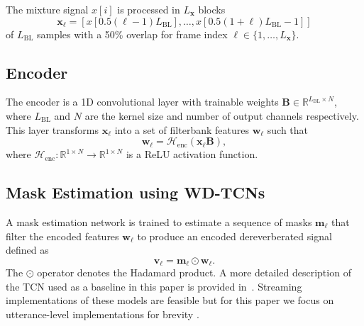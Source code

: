 \documentclass{article}
\newcommand{\mat}[1]{\mathbf{#1}}
\newcommand{\vek}[1]{\ensuremath{\mathbf{#1}}}    \newcommand{\vekc}[1]{\ensuremath{\boldsymbol{\mathcal{#1}}}}
\newcommand{\Real}{\mathbb{R}}
\begin{document}
The mixture signal $x[i]$ is processed in $L_\vek{x}$ blocks 
\begin{equation}\label{eq:InputSignalBlock}
    \vek{x}_\ell = 
\left[x[0.5(\ell-1)L_{\mathrm{BL}}],\ldots, x[0.5(1+\ell) L_{\mathrm{BL}}-1]\right]
\end{equation}
of $L_\mathrm{BL}$ samples with a 50\% overlap for frame index $\ell \in \{1,\ldots,L_\vek{x}\}$.

\subsection{Encoder}
The encoder is a 1D convolutional layer with trainable weights $\mat{B}\in\Real^{L_\mathrm{BL}\times N}$, where $L_\mathrm{BL}$ and $N$ are the kernel size and number of output channels respectively. This layer transforms $\vek{x}_\ell$ into a set of filterbank features $\mat{w}_\ell$ such that
\begin{equation}\label{eq:encoder}
 \mat{w}_\ell=\mathcal{H}_\mathrm{enc}\left(\vek{x}_\ell\mat{B}\right){,}
\end{equation}
where $\mathcal{H}_\mathrm{enc}:\Real^{1\times N} \rightarrow \Real^{ 1\times N}$ is a ReLU activation function.


\subsection{Mask Estimation using \texorpdfstring{\Acp{WD-TCN}}{WD-TCNs} }
A mask estimation network is trained to estimate a sequence of masks $\mat{m}_\ell$ that filter the encoded features $\vek{w}_\ell$ to produce an encoded dereverberated signal defined as
\begin{equation}
    \mat{v}_{\ell}=\mat{m}_{\ell}\odot\mat{w}_\ell.
\end{equation}
The $\odot$ operator denotes the Hadamard product. A more detailed description of the \ac{TCN} used as a baseline in this paper 
is provided in~\cite{atttasnet}. Streaming implementations of these models are feasible but for this paper we focus on utterance-level implementations for brevity \cite{convtasnet}. 
\end{document}
